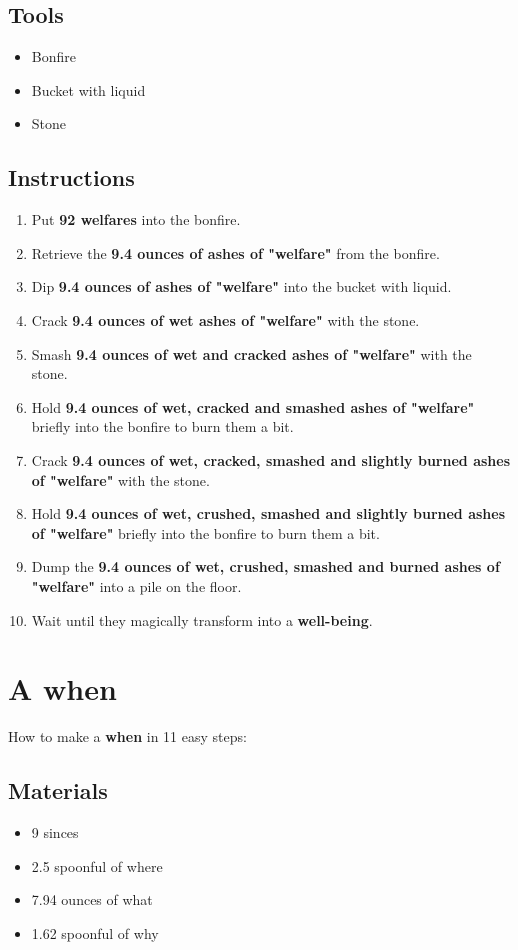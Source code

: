 \documentclass{article}
\begin{document}
\subsection{Tools}\begin{itemize}
\item 
Bonfire
\item 
Bucket with liquid
\item 
Stone
\end{itemize}
\subsection{Instructions}\begin{enumerate}
\item 
Put \textbf{92 welfares} into the bonfire.
\item 
Retrieve the \textbf{9.4 ounces of ashes of "welfare"} from the bonfire.
\item 
Dip \textbf{9.4 ounces of ashes of "welfare"} into the bucket with liquid.
\item 
Crack \textbf{9.4 ounces of wet ashes of "welfare"} with the stone.
\item 
Smash \textbf{9.4 ounces of wet and cracked ashes of "welfare"} with the stone.
\item 
Hold \textbf{9.4 ounces of wet, cracked and smashed ashes of "welfare"} briefly into the bonfire to burn them a bit.
\item 
Crack \textbf{9.4 ounces of wet, cracked, smashed and slightly burned ashes of "welfare"} with the stone.
\item 
Hold \textbf{9.4 ounces of wet, crushed, smashed and slightly burned ashes of "welfare"} briefly into the bonfire to burn them a bit.
\item 
Dump the \textbf{9.4 ounces of wet, crushed, smashed and burned ashes of "welfare"} into a pile on the floor.
\item 
Wait until they magically transform into a \textbf{well-being}.
\end{enumerate}
\newpage
\section{A when}How to make a \textbf{when} in 11 easy steps:

\subsection{Materials}\begin{itemize}
\item 
9 sinces
\item 
2.5 spoonful of where
\item 
7.94 ounces of what
\item 
1.62 spoonful of why
\end{itemize}
\end{document}

